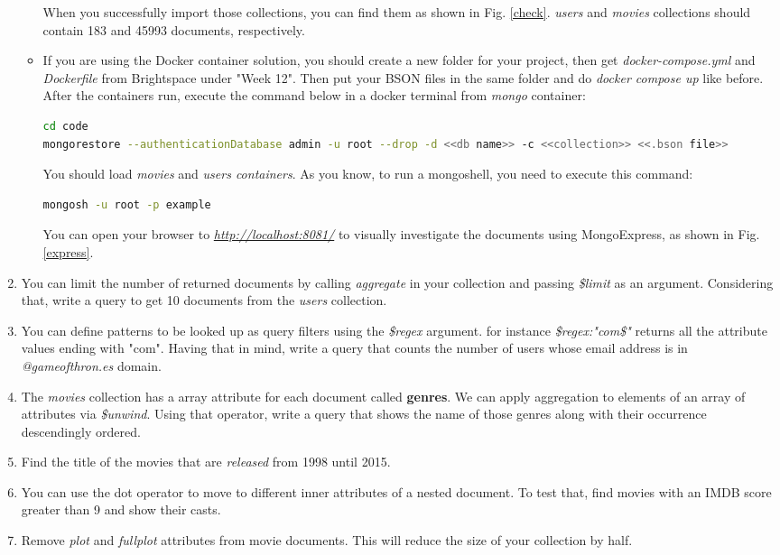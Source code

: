 \documentclass{homework}
\begin{document}
\begin{enumerate}[label=\roman*)]
\begin{itemize}
    \newpage
    When you successfully import those collections, you can find them as shown in Fig. \ref{check}. \textit{users} and \textit{movies} collections should contain 183 and 45993 documents, respectively.
    \item If you are using the Docker container solution, you should create a new folder for your project, then get \textit{docker-compose.yml} and \textit{Dockerfile} from Brightspace under "Week 12". Then put your BSON files in the same folder and do \textit{docker compose up} like before. After the containers run, execute the command below in a docker terminal from \textit{mongo} container:

    \newpage
    \begin{lstlisting}[language=bash]
cd code 
mongorestore --authenticationDatabase admin -u root --drop -d <<db name>> -c <<collection>> <<.bson file>>
\end{lstlisting}
    You should load \textit{movies} and \textit{users containers}. As you know, to run a mongoshell, you need to execute this command:
    \begin{lstlisting}[language=bash]
mongosh -u root -p example
\end{lstlisting}
You can open your browser to \href{http://localhost:8081/}{\textit{http://localhost:8081/}} to visually investigate the documents using MongoExpress, as shown in Fig. \ref{express}.
    \end{itemize}

\item You can limit the number of returned documents by calling \textit{aggregate} in your collection and passing \textit{\$limit} as an argument. Considering that, write a query to get 10 documents from the \textit{users} collection.
\item You can define patterns to be looked up as query filters using the \textit{\$regex} argument. for instance \textit{\$regex:"com\$"}
returns all the attribute values ending with "com". Having that in mind, write a query that counts the number of users whose email address is in \textit{@gameofthron.es} domain.
\item The \textit{movies} collection has a array attribute for each document called \textbf{genres}. We can apply aggregation to elements of an array of attributes via \textit{\$unwind}. Using that operator, write a query that shows the name of those genres along with their occurrence descendingly ordered.

\item Find the title of the movies that are \textit{released} from 1998 until 2015.

\item You can use the dot operator to move to different inner attributes of a nested document. To test that, find movies with an IMDB score greater than 9 and show their casts.

\item Remove \textit{plot} and \textit{fullplot} attributes from movie documents. This will reduce the size of your collection by half.
\end{enumerate}
\end{document}
